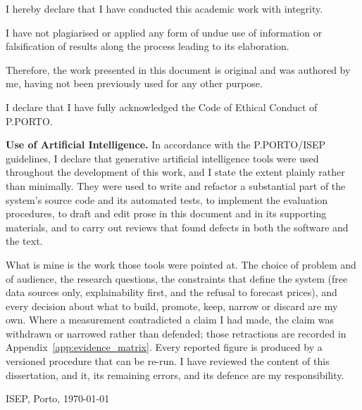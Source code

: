 \begin{soi}

\vspace{1cm}

I hereby declare that I have conducted this academic work with integrity.

I have not plagiarised or applied any form of undue use of information or falsification of results along the
process leading to its elaboration.

Therefore, the work presented in this document is original and was authored by me, having not been previously
used for any other purpose.

I declare that I have fully acknowledged the Code of Ethical Conduct of P.PORTO.

\vspace{0.5cm}

\textbf{Use of Artificial Intelligence.} In accordance with the P.PORTO/ISEP guidelines, I declare that
generative artificial intelligence tools were used throughout the development of this work, and I state
the extent plainly rather than minimally. They were used to write and refactor a substantial part of the
system's source code and its automated tests, to implement the evaluation procedures, to draft and edit
prose in this document and in its supporting materials, and to carry out reviews that found defects in
both the software and the text.

What is mine is the work those tools were pointed at. The choice of problem and of audience, the research
questions, the constraints that define the system (free data sources only, explainability first, and the
refusal to forecast prices), and every decision about what to build, promote, keep, narrow or discard are
my own. Where a measurement contradicted a claim I had made, the claim was withdrawn or narrowed rather
than defended; those retractions are recorded in Appendix~\ref{app:evidence_matrix}. Every reported figure
is produced by a versioned procedure that can be re-run. I have reviewed the content of this dissertation,
and it, its remaining errors, and its defence are my responsibility.

\vspace{1cm}

ISEP, Porto, \today %

\end{soi}


